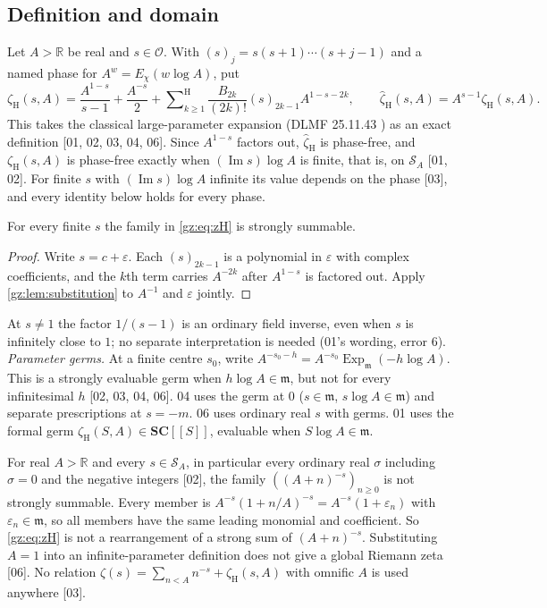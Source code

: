 \documentclass[11pt,a4paper]{article}
\numberwithin{equation}{section}
\theoremstyle{definition}
\theoremstyle{remark}
\newcommand{\SC}{\mathbf{SC}}
\newcommand{\R}{\mathbb R}
\newcommand{\OO}{\mathcal O}
\newcommand{\mm}{\mathfrak m}
\newcommand{\eps}{\varepsilon}
\renewcommand{\Im}{\operatorname{Im}}
\newcommand{\Ex}{\operatorname{Exp}_{\mm}}
\newcommand{\Sh}{\mathop{\textstyle\sum}\nolimits^{\mathrm H}}
\newcommand{\zH}{\zeta_{\mathrm H}}
\newcommand{\zHh}{\widehat\zeta_{\mathrm H}}
\newcommand{\SA}{\mathcal S_{A}}
\newcommand{\src}[1]{\textup{[#1]}}
\begin{document}
\subsection{Definition and domain}
Let $A>\R$ be real and $s\in\OO$. With $(s)_j=s(s+1)\cdots(s+j-1)$ and a
named phase for $A^w=E_\chi(w\log A)$, put
\begin{equation}\label{gz:eq:zH}
\zH(s,A)=\frac{A^{1-s}}{s-1}+\frac{A^{-s}}2+\Sh_{k\ge1}\frac{B_{2k}}{(2k)!}(s)_{2k-1}A^{1-s-2k},\qquad
\zHh(s,A)=A^{s-1}\zH(s,A).
\end{equation}
This takes the classical large-parameter expansion (DLMF 25.11.43
\cite{DLMF2511}) as an exact definition \src{01, 02, 03, 04, 06}. Since
$A^{1-s}$ factors out, $\zHh$ is phase-free, and $\zH(s,A)$ is phase-free
exactly when $(\Im s)\log A$ is finite, that is, on $\SA$ \src{01, 02}.
For finite $s$ with $(\Im s)\log A$ infinite its value depends on the phase
\src{03}, and every identity below holds for every phase.
\begin{proposition}[Existence \src{01, 02, 03}]\label{gz:prop:hurwitz-exists}
For every finite $s$ the family in \eqref{gz:eq:zH} is strongly summable.
\end{proposition}
\begin{proof}
Write $s=c+\eps$. Each $(s)_{2k-1}$ is a polynomial in $\eps$ with complex
coefficients, and the $k$th term carries $A^{-2k}$ after $A^{1-s}$ is
factored out. Apply \cref{gz:lem:substitution} to $A^{-1}$ and $\eps$
jointly.
\end{proof}
At $s\ne1$ the factor $1/(s-1)$ is an ordinary field inverse, even when $s$
is infinitely close to $1$; no separate interpretation is needed (01's
wording, error 6). \emph{Parameter germs.} At a finite centre $s_0$, write
$A^{-s_0-h}=A^{-s_0}\Ex(-h\log A)$. This is a strongly evaluable germ when
$h\log A\in\mm$, but not for every infinitesimal $h$ \src{02, 03, 04, 06}.
04 uses the germ at $0$ ($s\in\mm$, $s\log A\in\mm$) and separate
prescriptions at $s=-m$. 06 uses ordinary real $s$ with germs. 01 uses the
formal germ $\zH(S,A)\in\SC[[S]]$, evaluable when $S\log A\in\mm$.

\begin{warning}[The raw shifted sum \src{01, 02, 03, 04, 06}]\label{gz:warn:hurwitz-raw}
For real $A>\R$ and every $s\in\SA$, in particular every ordinary real
$\sigma$ including $\sigma=0$ and the negative integers \src{02}, the family
$((A+n)^{-s})_{n\ge0}$ is not strongly summable. Every member is
$A^{-s}(1+n/A)^{-s}=A^{-s}(1+\eps_n)$ with $\eps_n\in\mm$, so all members
have the same leading monomial and coefficient. So \eqref{gz:eq:zH} is not
a rearrangement of a strong sum of $(A+n)^{-s}$. Substituting $A=1$ into an infinite-parameter
definition does not give a global Riemann zeta \src{06}. No relation
$\zeta(s)=\sum_{n<A}n^{-s}+\zH(s,A)$ with omnific $A$ is used anywhere
\src{03}.
\end{warning}
\end{document}
